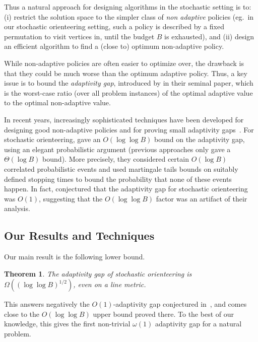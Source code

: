 \documentclass[11pt,letterpaper]{article}
\newtheorem{theorem}{Theorem}[section]
\numberwithin{algorithm}{section}
\begin{document}
Thus a natural approach for designing algorithms in the stochastic setting is to:
(i) restrict the solution space to the simpler class of {\em non adaptive} policies (eg.~in our stochastic orienteering setting, such a policy is described by a fixed permutation to visit vertices in, until the budget $B$ is exhausted), and (ii) design an efficient algorithm to find a
(close to) optimum non-adaptive policy.


While non-adaptive policies are often easier to optimize over, the drawback is that they could be much worse than the optimum adaptive policy. Thus, a key issue is to bound the {\em adaptivity gap}, introduced by \cite{DeanGV08} in their seminal paper,  which is the worst-case ratio (over all problem instances) of the optimal adaptive value to the optimal non-adaptive value. 

In recent years, increasingly sophisticated techniques have been developed for designing good non-adaptive policies and for proving small adaptivity gaps~\cite{DeanGV08,GuhaM09,chenetal,BGLMNR10,GKMR11,GKNR12}.
For stochastic orienteering, \cite{GKNR12} gave an $O(\log\log B)$ bound on the adaptivity gap, using an elegant probabilistic argument (previous approaches only gave a $\Theta(\log B)$ bound).
More precisely, they considered certain $O(\log B)$ correlated probabilistic events and used martingale tails bounds on suitably defined stopping times to bound the probability that none of these events happen.
In fact, \cite{GKNR12} conjectured that the adaptivity gap for stochastic orienteering was $O(1)$, suggesting that the $O(\log \log B)$ factor was an artifact of their analysis.



\subsection{Our Results and Techniques}


Our main result is the following lower bound.
\begin{theorem}\label{thm:ad-gap}
The adaptivity gap of stochastic orienteering is $\Omega\left((\log\log B)^{1/2}\right)$, even on a line metric.
\end{theorem}
This answers negatively the $O(1)$-adaptivity gap conjectured in~\cite{GKNR12}, and comes close to the $O(\log\log B)$ upper bound proved there. To the best of our knowledge, this gives the first non-trivial $\omega(1)$ adaptivity gap for a natural problem.
\end{document}
